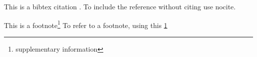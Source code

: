 \documentclass{article}
\begin{document}
This is a bibtex citation \cite{PhysRevB.78.104104}.
To include the reference without citing use nocite. \nocite{PhysRevLett.99.077601}

This is a footnote\footnote{\label{footnote1}supplementary information}
\newpage
To refer to a footnote, using this \ref{footnote1}


% 
% 
\end{document}
